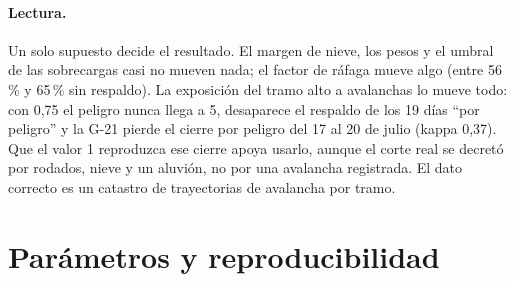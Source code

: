 \paragraph{Lectura.} Un solo supuesto decide el resultado. El margen de nieve, los pesos y el umbral de las sobrecargas casi no mueven nada; el factor de ráfaga mueve algo (entre 56\,\% y 65\,\% sin respaldo). La exposición del tramo alto a avalanchas lo mueve todo: con 0,75 el peligro nunca llega a 5, desaparece el respaldo de los 19 días ``por peligro'' y la G-21 pierde el cierre por peligro del 17 al 20 de julio (kappa 0,37). Que el valor 1 reproduzca ese cierre apoya usarlo, aunque el corte real se decretó por rodados, nieve y un aluvión, no por una avalancha registrada. El dato correcto es un catastro de trayectorias de avalancha por tramo.

\section{Parámetros y reproducibilidad}\label{sec:parametros}

